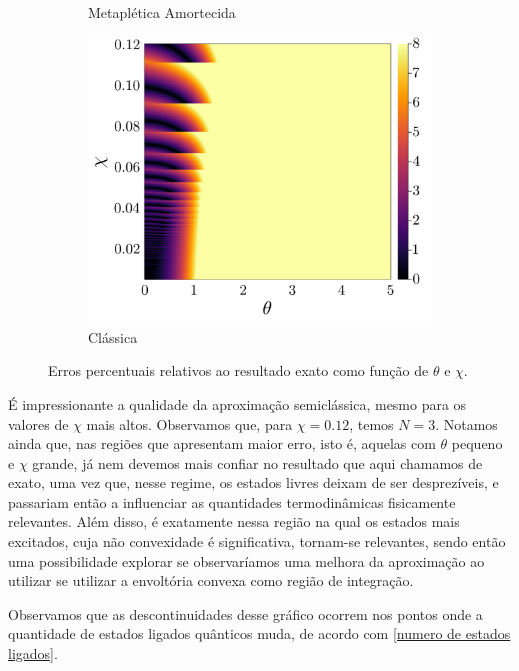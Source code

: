 \documentclass[
	12pt,
	oneside,			%
	a4paper,			%
	english,			%
	brazil				%
	]{abntex2}
\theoremstyle{definition}
\begin{document}
\begin{figure}[H]
\begin{subfigure}[b]{0.32\textwidth}
         \caption{Metaplética Amortecida}
         \label{erro relativo morse dm}
     \end{subfigure}
     \hfill
     \begin{subfigure}[b]{0.32\textwidth}
         \centering
         \includegraphics[width=\textwidth]{Imagens/error_cl.png}
         \caption{Clássica}
         \label{erro relativo morse cl}
     \end{subfigure}
        \caption{Erros percentuais relativos ao resultado exato como função de $\theta$ e $\chi$.}
        \label{erros relativos morse}
\end{figure}

É impressionante a qualidade da aproximação semiclássica, mesmo para os valores de $\chi$ mais altos. Observamos que, para $\chi=0.12$, temos $N=3$. Notamos ainda que, nas regiões que apresentam maior erro, isto é, aquelas com $\theta$ pequeno e $\chi$ grande, já nem devemos mais confiar no resultado que aqui chamamos de exato, uma vez que, nesse regime, os estados livres deixam de ser desprezíveis, e passariam então a influenciar as quantidades termodinâmicas fisicamente relevantes. Além disso, é exatamente nessa região na qual os estados mais excitados, cuja não convexidade é significativa, tornam-se relevantes, sendo então uma possibilidade explorar se observaríamos uma melhora da aproximação ao utilizar se utilizar a envoltória convexa como região de integração.

Observamos que as descontinuidades desse gráfico ocorrem nos pontos onde a quantidade de estados ligados quânticos muda, de acordo com \eqref{numero de estados ligados}.
\end{document}
